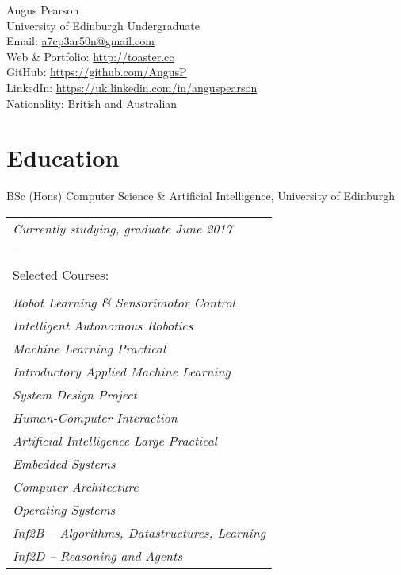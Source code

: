 \documentclass[10pt, a4paper]{article}
\newcommand{\years}[1]{\marginnote{\scriptsize #1}}
\begin{document}
{\huge Angus Pearson}\\[1cm]
University of Edinburgh Undergraduate\\

Email: \href{mailto:a7cp3ar50n@gmail.com}{a7cp3ar50n@gmail.com}\\
Web \& Portfolio:   \href{http://toaster.cc}{http://toaster.cc}\\
GitHub: \href{https://github.com/AngusP}{https://github.com/AngusP} \\
LinkedIn: \href{https://uk.linkedin.com/in/anguspearson}{https://uk.linkedin.com/in/anguspearson}\\


Nationality:  British and Australian

\section*{Education}

\years{2013-2017} BSc (Hons) Computer Science \& Artificial Intelligence, University of Edinburgh\\

\begin{tabular}{l}
  \emph{Currently studying, graduate June 2017} \\
  --\\
  Selected Courses:\\
  \\
  \emph{Robot Learning \& Sensorimotor Control}\\
  \emph{Intelligent Autonomous Robotics}\\
  \emph{Machine Learning Practical}\\
  \emph{Introductory Applied Machine Learning}\\
  \emph{System Design Project}\\
  \emph{Human-Computer Interaction}\\
  \emph{Artificial Intelligence Large Practical}\\
  \emph{Embedded Systems}\\
  \emph{Computer Architecture}\\
  \emph{Operating Systems}\\
  \emph{Inf2B -- Algorithms, Datastructures, Learning}\\
  \emph{Inf2D -- Reasoning and Agents}\\
\end{tabular}\\
\end{document}
